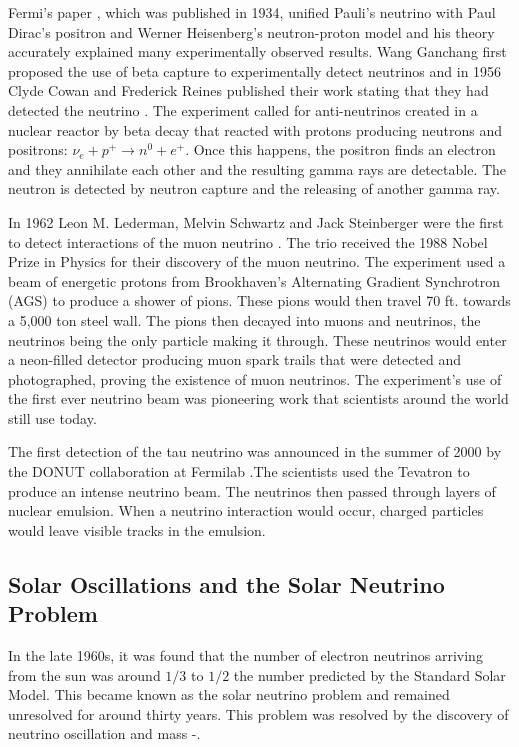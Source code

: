 Fermi's paper \cite{fermi}, which was published in 1934, unified Pauli's neutrino with Paul Dirac's positron and Werner Heisenberg's neutron-proton model and his theory accurately explained many experimentally observed results. Wang Ganchang first proposed the use of beta capture to experimentally detect neutrinos and in 1956 Clyde Cowan and Frederick Reines published their work stating that they had detected the neutrino \cite{cowan1}\cite{cowan2}. The experiment called for anti-neutrinos created in a nuclear reactor by beta decay that reacted with protons producing neutrons and positrons: $\nu_{e} +p^{+}\rightarrow n^{0} + e^{+}$. Once this happens, the positron finds an electron and they annihilate each other and the resulting gamma rays are detectable. The neutron is detected by neutron capture and the releasing of another gamma ray. 

In 1962 Leon M. Lederman, Melvin Schwartz and Jack Steinberger were the first to detect interactions of the muon neutrino \cite{leonlederman}. The trio received the 1988 Nobel Prize in Physics for their discovery of the muon neutrino. The experiment used a beam of energetic protons from Brookhaven's Alternating Gradient Synchrotron (AGS) to produce a shower of pions. These pions would then travel 70 ft. towards a 5,000 ton steel wall. The pions then decayed into muons and neutrinos, the neutrinos being the only particle making it through. These neutrinos would enter a neon-filled detector producing muon spark trails that were detected and photographed, proving the existence of muon neutrinos. The experiment's use of the first ever neutrino beam was pioneering work that scientists around the world still use today.  

The first detection of the tau neutrino was announced in the summer of 2000 by the DONUT collaboration at Fermilab \cite{donut}.The scientists used the Tevatron to produce an intense neutrino beam. The neutrinos then passed through layers of nuclear emulsion. When a neutrino interaction would occur, charged particles would leave visible tracks in the emulsion. 

\subsection{Solar Oscillations and the Solar Neutrino Problem}

In the late 1960s, it was found that the number of electron neutrinos arriving from the sun was around $1/3$ to $1/2$ the number predicted by the Standard Solar Model. This became known as the solar neutrino problem \cite{bahcall1} and remained unresolved for around thirty years. This problem was resolved by the discovery of neutrino oscillation and mass \cite{neutrinooscillation1}-\cite{neutrinooscillation4}.

